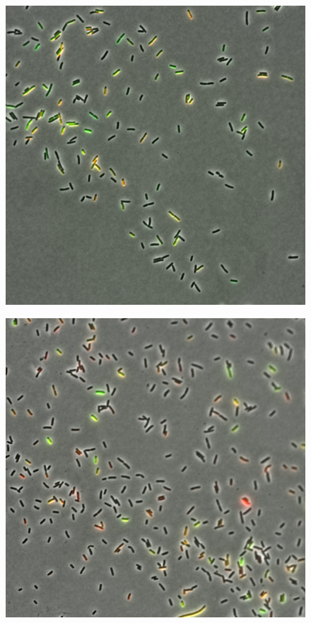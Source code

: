 \documentclass[english,11pt,a4paper]{article}
\begin{document}
\begin{figure}[hbtp]
\centering
	\begin{minipage}{.5\textwidth}
  		\centering
  		\includegraphics[width=.9\linewidth]{d8007LateComposite.jpg}
  		\label{fig:onc1AfterHoursComposite}
	\end{minipage}%
	\begin{minipage}{.5\textwidth}
  		\centering
  		\includegraphics[width=.9\linewidth]{h8LateComposite.jpg}
  		\label{fig:onc2AfterHoursComposite}  
	\end{minipage}
\end{figure}
\end{document}
